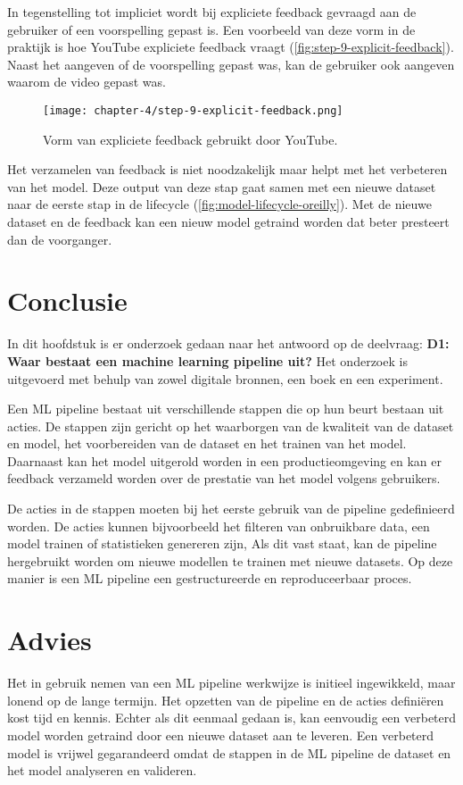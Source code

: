 In tegenstelling tot impliciet wordt bij expliciete feedback gevraagd aan de gebruiker of een voorspelling gepast is. Een voorbeeld van deze vorm in de praktijk is hoe YouTube expliciete feedback vraagt (\autoref{fig:step-9-explicit-feedback}). Naast het aangeven of de voorspelling gepast was, kan de gebruiker ook aangeven waarom de video gepast was.

\begin{figure}[hbt!]
  \centering
  \texttt{[image: chapter-4/step-9-explicit-feedback.png]}
  \caption{Vorm van expliciete feedback gebruikt door YouTube.}
  \label{fig:step-9-explicit-feedback}
\end{figure}

Het verzamelen van feedback is niet noodzakelijk maar helpt met het verbeteren van het model. Deze output van deze stap gaat samen met een nieuwe dataset naar de eerste stap in de lifecycle (\autoref{fig:model-lifecycle-oreilly}). Met de nieuwe dataset en de feedback kan een nieuw model getraind worden dat beter presteert dan de voorganger.

\section{Conclusie}\label{sec:ch4-conclusie}
In dit hoofdstuk is er onderzoek gedaan naar het antwoord op de deelvraag: \textbf{D1: Waar bestaat een machine learning pipeline uit?} Het onderzoek is uitgevoerd met behulp van zowel digitale bronnen, een boek en een experiment.

Een ML pipeline bestaat uit verschillende stappen die op hun beurt bestaan uit acties. De stappen zijn gericht op het waarborgen van de kwaliteit van de dataset en model, het voorbereiden van de dataset en het trainen van het model. Daarnaast kan het model uitgerold worden in een productieomgeving en kan er feedback verzameld worden over de prestatie van het model volgens gebruikers.

De acties in de stappen moeten bij het eerste gebruik van de pipeline gedefinieerd worden. De acties kunnen bijvoorbeeld het filteren van onbruikbare data, een model trainen of statistieken genereren zijn, Als dit vast staat, kan de pipeline hergebruikt worden om nieuwe modellen te trainen met nieuwe datasets. Op deze manier is een ML pipeline een gestructureerde en reproduceerbaar proces.

\section{Advies}\label{sec:ch4-advies}
Het in gebruik nemen van een ML pipeline werkwijze is initieel ingewikkeld, maar lonend op de lange termijn. Het opzetten van de pipeline en de acties definiëren kost tijd en kennis. Echter als dit eenmaal gedaan is, kan eenvoudig een verbeterd model worden getraind door een nieuwe dataset aan te leveren. Een verbeterd model is vrijwel gegarandeerd omdat de stappen in de ML pipeline de dataset en het model analyseren en valideren.

